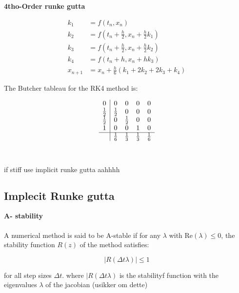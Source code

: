 \textbf{4tho-Order runke gutta }

\begin{align}
k_1 &= f(t_n, x_n) \\
k_2 &= f\left(t_n + \frac{h}{2}, x_n + \frac{h}{2} k_1\right) \\
k_3 &= f\left(t_n + \frac{h}{2}, x_n + \frac{h}{2} k_2\right) \\
k_4 &= f(t_n + h, x_n + h k_3) \\
x_{n+1} &= x_n + \frac{h}{6} \left( k_1 + 2k_2 + 2k_3 + k_4 \right)
\end{align}

The Butcher tableau for the RK4 method is:

\[
\begin{array}{c|cccc}
0 & 0 & 0 & 0 & 0 \\
\frac{1}{2} & \frac{1}{2} & 0 & 0 & 0 \\
\frac{1}{2} & 0 & \frac{1}{2} & 0 & 0 \\
1 & 0 & 0 & 1 & 0 \\
\hline
 & \frac{1}{6} & \frac{1}{3} & \frac{1}{3} & \frac{1}{6} \\
\end{array}
\]
\\
\\
if stiff use implicit runke gutta aahhhh


\subsection{Implecit Runke gutta}
\textbf{A- stability}
\\
\\
A numerical method is said to be A-stable if for any \(\lambda\) with \(\text{Re}(\lambda) \leq 0\), the stability function \(R(z)\) of the method satisfies:

\[
|R(\Delta t \lambda)| \leq 1
\]

for all step sizes \(\Delta t\). where  $|R(\Delta t \lambda)$ is the stabilityf function with the eigenvalues $\lambda$  of the jacobian (usikker om dette)